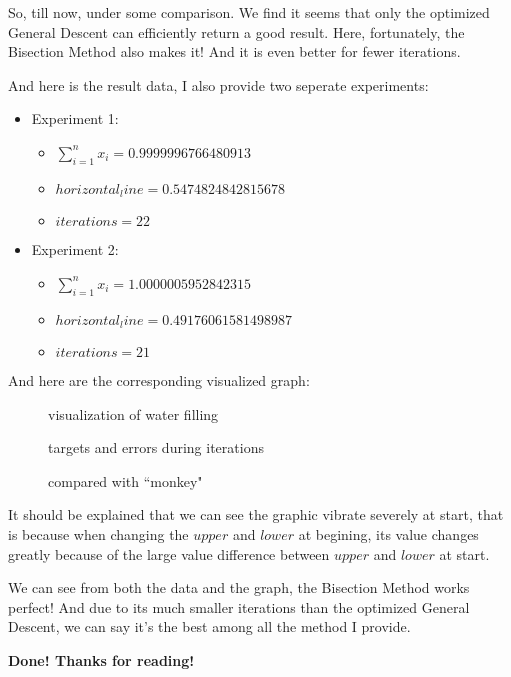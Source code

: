 \documentclass[a4paper,12pt]{article}
\begin{document}
    So, till now, under some comparison. We find it seems that only the optimized General Descent can efficiently return a good result. Here, fortunately, the Bisection Method also makes it! And it is even better for fewer iterations.

    And here is the result data, I also provide two seperate experiments:
    \begin{itemize}
        \item Experiment 1:
        \begin{itemize}
            \item $\sum_{i=1}^{n} x_i = 0.9999996766480913$
            \item $horizontal_line = 0.5474824842815678$
            \item $iterations = 22$ 
        \end{itemize}
        \item Experiment 2:
        \begin{itemize}
            \item $\sum_{i=1}^{n} x_i = 1.0000005952842315$
            \item $horizontal_line = 0.49176061581498987$
            \item $iterations = 21$
        \end{itemize}
    \end{itemize}

    And here are the corresponding visualized graph:
    \begin{figure}[H]
        \centering
        \quad
        \caption{visualization of water filling}
    \end{figure}
    \begin{figure}[H]
        \centering
        \quad
        \caption{targets and errors during iterations}
    \end{figure}
    \begin{figure}[H]
        \centering
        \quad
        \caption{compared with ``monkey"}
    \end{figure}

    It should be explained that we can see the graphic vibrate severely at start, that is because when changing the $upper$ and $lower$ at begining, its value changes greatly because of the large value difference between $upper$ and $lower$ at start.
    
    We can see from both the data and the graph, the Bisection Method works perfect! And due to its much smaller iterations than the optimized General Descent, we can say it's the best among all the method I provide.
    
    \vspace*{1cm}
    \textbf{Done! Thanks for reading!}
\end{document}
